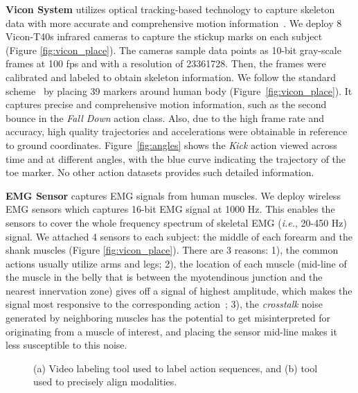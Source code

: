 \documentclass[a4paper, 10pt, conference]{ieeeconf}      \usepackage{FG2020}
\newcommand*\ie{\textit{i.e.}}
\begin{document}
\textbf{Vicon System} utilizes optical tracking-based technology to capture skeleton data with more accurate and comprehensive motion information~\cite{vicon_VS_kinect1}. We deploy 8 Vicon-T40s infrared cameras to capture the stickup marks on each subject (Figure \ref{fig:vicon_place}). The cameras sample data points as 10-bit gray-scale frames at 100 fps and with a resolution of 23361728. Then, the frames were calibrated and labeled to obtain skeleton information. We follow the standard scheme~\cite{vicon_plugin} by placing 39 markers around human body (Figure~\ref{fig:vicon_place}). It captures precise and comprehensive motion information, such as the second bounce in the \textit{Fall Down} action class. Also, due to the high frame rate and accuracy, high quality trajectories and accelerations were obtainable in reference to ground coordinates. Figure~\ref{fig:angles} shows the \textit{Kick} action viewed across time and at different angles, with the blue curve indicating the trajectory of the toe marker. No other action datasets provides such detailed information.

\textbf{EMG Sensor} captures EMG signals from human muscles. We deploy wireless EMG sensors which captures 16-bit EMG signal at 1000 Hz. This enables the sensors to cover the whole frequency spectrum of skeletal EMG (\ie, 20-450 Hz) signal. We attached 4 sensors to each subject: the middle of each forearm and the shank muscles (Figure \ref{fig:vicon_place}). There are 3 reasons: 1), the common actions usually utilize arms and legs; 2), the location of each muscle (mid-line of the muscle in the belly that is between the myotendinous junction and the nearest innervation zone) gives off a signal of highest amplitude, which makes the signal most responsive to the corresponding action~\cite{EMG_intro}; 3), the \textit{crosstalk} noise generated by neighboring muscles has the potential to get misinterpreted for originating from a muscle of interest, and placing the sensor mid-line makes it less susceptible to this noise.

\begin{figure}[t!]
\centering
{}
\vspace{-4mm}
\caption{(a) Video labeling tool used to label action sequences, and (b) tool used to precisely align modalities.}
\vspace{-5mm}
\label{fig:subfig} \end{figure}
\end{document}
